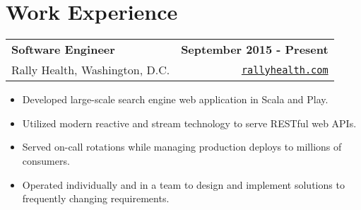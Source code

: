 \documentclass[letterpaper]{article}
\newenvironment{details}
{\begin{itemize}}
{\end{itemize}}
\begin{document}
%
%
%
%


  \section{Work Experience}

  \noindent
  \begin{tabularx}{\textwidth}{@{}X r@{}}
    \textbf{Software Engineer} & \textbf{September 2015 - Present} \\
    Rally Health, Washington, D.C. & \texttt{\href{http://rallyhealth.com}{rallyhealth.com}}
  \end{tabularx}

  \begin{details}
  \item Developed large-scale search engine web application in Scala and Play.
  \item Utilized modern reactive and stream technology to serve RESTful web APIs.
  \item Served on-call rotations while managing production deploys to millions of consumers.
  \item Operated individually and in a team to design and implement solutions to frequently changing requirements.
  \end{details}
\end{document}
